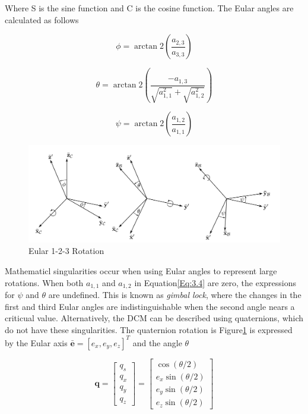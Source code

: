 \noindent Where S is the sine function and C is the cosine function. The Eular angles are calculated as follows

\begin{equation}
    \phi = \arctan2\left(\frac{a_{2,3}}{a_{3,3}}\right)
\end{equation}

\begin{equation}
    \theta = \arctan2\left(\frac{-a_{1,3}}{\sqrt{a_{1,1}^2} + \sqrt{a_{1,2}^2}}\right)
\end{equation}

\begin{equation}
    \psi = \arctan2\left(\frac{a_{1,2}}{a_{1,1}}\right)
\end{equation}

\begin{figure}[H]
    \centering
    \includegraphics[width=\linewidth]{figures/modelling/213 Eular Rotation.pdf}
    \caption{Eular 1-2-3 Rotation\cite{Jongh}}
    \label{fig:3.1}
\end{figure}

\noindent Mathematicl singularities occur when using Eular angles to represent large rotations. When both $a_{1,1}$ and $a_{1,2}$ in Equation\ref{Eq:3.4} are zero, 
the expressions for $\psi$ and $\theta$ are undefined. This is known as \textit{gimbal lock}, where the changes in the first and third Eular angles are 
indistinguishable when the second angle nears a criticual value. Alternatively, the DCM can be described using quaternions, which do not have 
these singularities. The quaternion rotation is Figure\ref{fig:3.1} is expressed by the Eular axis
$\mathbf{\bar{e}}={[e_x,e_y,e_z]}^T$ and the angle $\theta$

\begin{equation}
    \mathbf{q} = \begin{bmatrix} q_s \\ q_x \\ q_y \\ q_z \end{bmatrix}
    = \begin{bmatrix} \cos(\theta/2) \\ e_x\sin(\theta/2) \\ e_y\sin(\theta/2) \\ e_z\sin(\theta/2) \end{bmatrix}
\end{equation}

